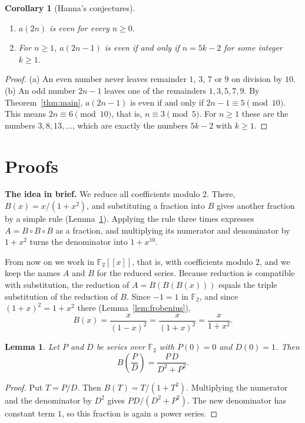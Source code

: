 \documentclass[11pt,a4paper]{article}
\newtheorem{lemma}[theorem]{Lemma}
\newtheorem{corollary}[theorem]{Corollary}
\theoremstyle{definition}
\theoremstyle{remark}
\newcommand{\F}{\mathbb{F}}
\newcommand{\ps}[1]{#1[[x]]}
\newcommand{\para}[1]{\par\medskip\noindent\textbf{#1}\enspace}
\begin{document}
\begin{corollary}[Hanna's conjectures]\label{cor:conj}
\begin{enumerate}[label=(\alph*)]
\item $a(2n)$ is even for every $n\ge0$.
\item For $n\ge1$, $a(2n-1)$ is even if and only if $n=5k-2$ for some integer $k\ge1$.
\end{enumerate}
\end{corollary}

\begin{proof}
(a) An even number never leaves remainder $1$, $3$, $7$ or $9$ on division by $10$.
(b) An odd number $2n-1$ leaves one of the remainders $1,3,5,7,9$. By Theorem~\ref{thm:main}, $a(2n-1)$ is even
if and only if $2n-1\equiv5\pmod{10}$. This means $2n\equiv6\pmod{10}$, that is, $n\equiv3\pmod5$. For
$n\ge1$ these are the numbers $3,8,13,\dots$, which are exactly the numbers $5k-2$ with $k\ge1$.
\end{proof}

\section{Proofs}\label{sec:proofs}

\para{The idea in brief.} We reduce all coefficients modulo $2$. There, $B(x)=x/(1+x^2)$, and substituting a fraction
into $B$ gives another fraction by a simple rule (Lemma~\ref{lem:step}). Applying the rule three times expresses
$A=B\circ B\circ B$ as a fraction, and multiplying its numerator and denominator by $1+x^2$ turns the denominator into
$1+x^{10}$.

From now on we work in $\ps{\F_2}$, that is, with coefficients modulo $2$, and we keep the names $A$ and $B$ for the
reduced series. Because reduction is compatible with substitution, the reduction of $A=B(B(B(x)))$ equals the triple
substitution of the reduction of $B$. Since $-1=1$ in $\F_2$, and since $(1+x)^2=1+x^2$ there (Lemma~\ref{lem:frobenius}),
\[
B(x)=\frac{x}{(1-x)^2}=\frac{x}{(1+x)^2}=\frac{x}{1+x^2}.
\]

\begin{lemma}\label{lem:step}
Let $P$ and $D$ be series over $\F_2$ with $P(0)=0$ and $D(0)=1$. Then
\[
B\!\left(\frac PD\right)=\frac{P\,D}{D^2+P^2}.
\]
\end{lemma}

\begin{proof}
Put $T=P/D$. Then $B(T)=T/(1+T^2)$. Multiplying the numerator and the denominator by $D^2$ gives
$PD/(D^2+P^2)$. The new denominator has constant term $1$, so this fraction is again a power series.
\end{proof}
\end{document}
